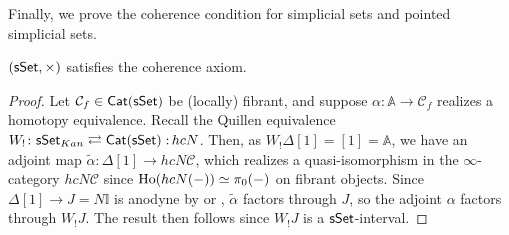 \documentclass[a4paper,10pt
,draft
]{article}%
\newcommand{\I}{\mathbb I}
\renewcommand{\1}{\eta}%
\begin{document}
Finally, we prove the coherence condition for simplicial sets and pointed simplicial sets.
\begin{proposition}
      \label{SSET_COH_PROP}
      $(\mathsf{sSet}, \times)$
      satisfies the coherence axiom.
\end{proposition}
\begin{proof}
      Let $\mathcal C_f \in \mathsf{Cat}(\mathsf{sSet})$ be (locally) fibrant, and
      suppose $\alpha: \mathbb A \to \mathcal C_f$ realizes a homotopy equivalence.
      Recall the Quillen equivalence $W_!\colon \mathsf{sSet}_{Kan} \rightleftarrows \mathsf{Cat}(\mathsf{sSet}) \, \colon \! h c N$.
      Then, as $W_!\Delta[1] = [1] = \mathbb A$, we have an adjoint map $\tilde \alpha: \Delta[1] \to h c N \mathcal C$,
      which realizes a quasi-isomorphism in the $\infty$-category $h c N \mathcal C$ since $\operatorname{Ho}(h c N (-)) \simeq \pi_0(-)$ on fibrant objects.
      Since $\Delta[1] \to J = N \I$ is anodyne by \cite[Corollary 1.6]{Joy02} or \cite[Lemma 0.15]{Rie}, 
      $\tilde \alpha$ factors through $J$,
      so the adjoint $\alpha$ factors through $W_!J$.
      The result then follows since $W_!J$ is a $\mathsf{sSet}$-interval.
\end{proof}

\end{document}
